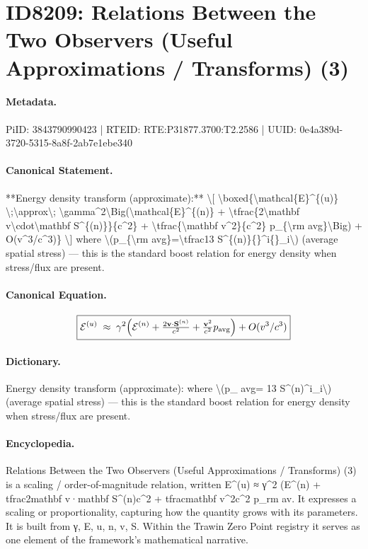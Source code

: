 \section*{ID8209: Relations Between the Two Observers (Useful Approximations / Transforms) (3)}
\paragraph{Metadata.}
PiID: 3843790990423 | RTEID: RTE:P31877.3700:T2.2586 | UUID: 0e4a389d-3720-5315-8a8f-2ab7e1ebe340

\paragraph{Canonical Statement.}
**Energy density transform (approximate):** \textbackslash{}[ \textbackslash{}boxed\{\textbackslash{}mathcal\{E\}\textasciicircum{}\{(u)\} \textbackslash{};\textbackslash{}approx\textbackslash{}; \textbackslash{}gamma\textasciicircum{}2\textbackslash{}Big(\textbackslash{}mathcal\{E\}\textasciicircum{}\{(n)\} + \textbackslash{}tfrac\{2\textbackslash{}mathbf v\textbackslash{}cdot\textbackslash{}mathbf S\textasciicircum{}\{(n)\}\}\{c\textasciicircum{}2\} + \textbackslash{}tfrac\{\textbackslash{}mathbf v\textasciicircum{}2\}\{c\textasciicircum{}2\} p\_\{\textbackslash{}rm avg\}\textbackslash{}Big) + O(v\textasciicircum{}3/c\textasciicircum{}3)\} \textbackslash{}] where \textbackslash{}(p\_\{\textbackslash{}rm avg\}=\textbackslash{}tfrac13 S\textasciicircum{}\{(n)\}\{\}\textasciicircum{}i\{\}\_i\textbackslash{}) (average spatial stress) — this is the standard boost relation for energy density when stress/flux are present.

\paragraph{Canonical Equation.}
\[
\boxed{\mathcal{E}^{(u)} \;\approx\; \gamma^2\Big(\mathcal{E}^{(n)} + \tfrac{2\mathbf v\cdot\mathbf S^{(n)}}{c^2} + \tfrac{\mathbf v^2}{c^2} p_{\rm avg}\Big) + O(v^3/c^3)}
\]

\paragraph{Dictionary.}
Energy density transform (approximate): where \textbackslash{}(p\_ avg= 13 S\textasciicircum{}(n)\textasciicircum{}i\_i\textbackslash{}) (average spatial stress) — this is the standard boost relation for energy density when stress/flux are present.

\paragraph{Encyclopedia.}
Relations Between the Two Observers (Useful Approximations / Transforms) (3) is a scaling / order-of-magnitude relation, written E\textasciicircum{}(u) ≈ γ\textasciicircum{}2 (E\textasciicircum{}(n) + tfrac2mathbf v·mathbf S\textasciicircum{}(n)c\textasciicircum{}2 + tfracmathbf v\textasciicircum{}2c\textasciicircum{}2 p\_rm av. It expresses a scaling or proportionality, capturing how the quantity grows with its parameters. It is built from γ, E, u, n, v, S. Within the Trawin Zero Point registry it serves as one element of the framework's mathematical narrative.
